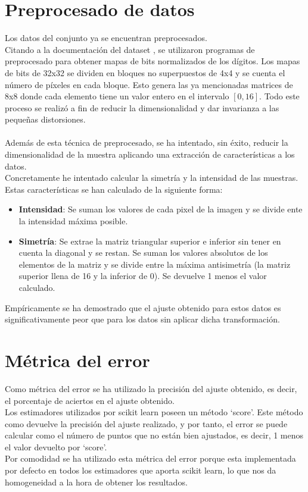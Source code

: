 \section{Preprocesado de datos}
Los datos del conjunto ya se encuentran preprocesados.\\
Citando a la documentación del dataset \cite{Optical} , se utilizaron programas de preprocesado  para obtener mapas de bits normalizados de los dígitos. Los mapas de bits de 32x32 se dividen en bloques no superpuestos de 4x4 y se cuenta el número de píxeles en cada bloque. Esto genera las ya mencionadas matrices de 8x8 donde cada elemento tiene un valor entero en el intervalo $[0,16]$. Todo este proceso se realizó a fin de reducir la dimensionalidad y dar invarianza a las pequeñas distorsiones.\\
\\
Además de esta técnica de preprocesado, se ha intentado, sin éxito, reducir la dimensionalidad de la muestra aplicando una extracción de características a los datos.\\
Concretamente he intentado calcular la simetría y la intensidad de las muestras.\\
Estas características se han calculado de la siguiente forma:
\begin{itemize}
   \item \textbf{Intensidad}: Se suman los valores de cada pixel de la imagen y se divide ente la intensidad máxima posible.
   \item \textbf{Simetría}: Se extrae la matriz triangular superior e inferior sin tener en cuenta la diagonal y se restan. Se suman los valores absolutos de los elementos de la matriz y se divide entre la máxima antisimetría (la matriz superior llena de 16 y la inferior de 0). Se devuelve 1 menos el valor calculado.
\end{itemize}
Empíricamente se ha demostrado que el ajuste obtenido para estos datos es significativamente peor que para los datos sin aplicar dicha transformación.

\section{Métrica del error}
Como métrica del error se ha utilizado la precisión del ajuste obtenido, es decir, el porcentaje de aciertos en el ajuste obtenido.\\
Los estimadores utilizados por scikit learn \cite{SGDClassifier} \cite{logisticRegression} poseen un método `score'. Este método como devuelve la precisión del ajuste realizado, y por tanto, el error se puede calcular como el número de puntos que no están bien ajustados, es decir, 1 menos el valor devuelto por `score'.\\
Por comodidad se ha utilizado esta métrica del error porque esta implementada por defecto en todos los estimadores que aporta scikit learn, lo que nos da homogeneidad a la hora de obtener los resultados.

